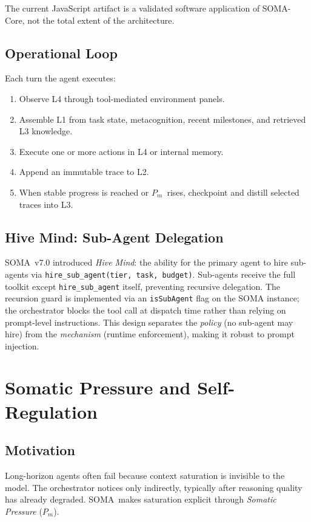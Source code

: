 \documentclass[11pt,a4paper]{article}
\newcommand{\soma}{\textsc{SOMA}}
\newcommand{\Pm}{\ensuremath{P_m}}
\begin{document}
The current JavaScript artifact is a validated software application of
SOMA-Core, not the total extent of the architecture.

\subsection{Operational Loop}

Each turn the agent executes:
\begin{enumerate}[leftmargin=*]
  \item Observe L4 through tool-mediated environment panels.
  \item Assemble L1 from task state, metacognition, recent milestones,
        and retrieved L3 knowledge.
  \item Execute one or more actions in L4 or internal memory.
  \item Append an immutable trace to L2.
  \item When stable progress is reached or \Pm\ rises, checkpoint and
        distill selected traces into L3.
\end{enumerate}

\subsection{Hive Mind: Sub-Agent Delegation}

\soma\ v7.0 introduced \textit{Hive Mind}: the ability for the primary agent
to hire sub-agents via \texttt{hire\_sub\_agent(tier, task, budget)}.
Sub-agents receive the full toolkit except \texttt{hire\_sub\_agent} itself,
preventing recursive delegation.
The recursion guard is implemented via an \texttt{isSubAgent} flag on the
SOMA instance; the orchestrator blocks the tool call at dispatch time rather
than relying on prompt-level instructions.
This design separates the \emph{policy} (no sub-agent may hire) from the
\emph{mechanism} (runtime enforcement), making it robust to prompt injection.

\section{Somatic Pressure and Self-Regulation}

\subsection{Motivation}

Long-horizon agents often fail because context saturation is invisible to the
model.
The orchestrator notices only indirectly, typically after reasoning quality
has already degraded.
\soma\ makes saturation explicit through \textit{Somatic Pressure} (\Pm).
\end{document}
